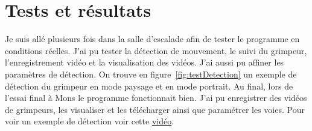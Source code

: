 \documentclass[a4paper, 11pt, french]{article}
\begin{document}
\section{Tests et résultats}
Je suis allé plusieurs fois dans la salle d'escalade afin de tester le programme en conditions réelles. J'ai pu tester la détection de mouvement, le suivi du grimpeur, l'enregistrement vidéo et la visualisation des vidéos. J'ai aussi pu affiner les paramètres de détection. On trouve en figure~\ref{fig:testDetection} un exemple de détection du grimpeur en mode paysage et en mode portrait. Au final, lors de l'essai final à Mons le programme fonctionnait bien. J'ai pu enregistrer des vidéos de grimpeurs, les visualiser et les télécharger ainsi que paramétrer les voies. Pour voir un exemple de détection voir cette \href{https://youtu.be/jRj4fich-2w}{vidéo}.
\end{document}
